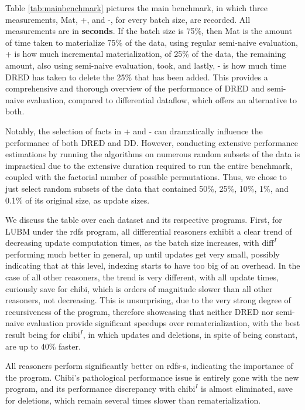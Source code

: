 \documentclass[sigconf,screen,review=false,natbib]{acmart}
\theoremstyle{definition}
\begin{document}
Table \ref{tab:mainbenchmark} pictures the main benchmark, in which three measurements, Mat, +, and -, for every batch size, are recorded. All measurements are in
\textbf{seconds}. If the batch size is 75\%, then Mat is the amount of time taken to materialize 75\% of the data, using regular semi-naive evaluation, + is how much
incremental materialization, of 25\% of the data, the remaining amount, also using semi-naive evaluation, took, and lastly, - is how much time DRED has taken to delete
the 25\% that has been added. This provides a comprehensive and thorough overview of the performance of DRED and semi-naive evaluation, compared to differential
dataflow, which offers an alternative to both.

Notably, the selection of facts in + and - can dramatically influence the performance of both DRED and DD. However, conducting extensive performance
estimations by running the algorithms on numerous random subsets of the data is impractical due to the extensive duration required to run the entire benchmark, coupled
with the factorial number of possible permutations. Thus, we chose to just select random subsets of the data that contained 50\%, 25\%, 10\%, 1\%, and 0.1\% of its
original size, as update sizes.

We discuss the table over each dataset and its respective programs. First, for LUBM under the rdfs program, all differential reasoners exhibit a clear trend of decreasing
update computation times, as the batch size increases, with $\text{diff}^{I}$ performing much better in general, up until updates get very small, possibly indicating
that at this level, indexing starts to have too big of an overhead. In the case of all other reasoners, the trend is very different, with all update times, curiously save for
chibi, which is orders of magnitude slower than all other reasoners,  not decreasing. This is unsurprising, due to the very strong degree of recursiveness of the
program, therefore showcasing that neither DRED nor semi-naive evaluation provide significant speedups over rematerialization, with the best result being for $\text{chibi}^I$, in
which updates and deletions, in spite of being constant, are up to 40\% faster.

All reasoners perform significantly better on rdfs-s, indicating the importance of the program. Chibi's pathological performance issue is entirely gone with the new program, and
its performance discrepancy with $\text{chibi}^{I}$ is almost eliminated, save for deletions, which remain several times slower than rematerialization.
\end{document}
